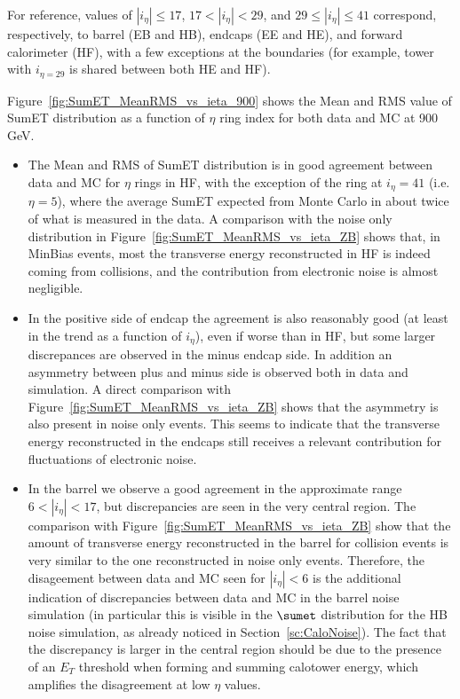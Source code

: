 For reference, values of $|i_{\eta}|\le17$, $17<|i_{\eta}|<29$, and $29\le|i_{\eta}|\le41$ 
correspond, respectively, to barrel (EB and HB), endcaps (EE and HE), and forward 
calorimeter (HF), with a few exceptions at the boundaries 
(for example, tower with $i_{\eta=29}$ is shared between both HE and HF).

Figure~\ref{fig:SumET_MeanRMS_vs_ieta_900} shows the Mean and RMS value of 
SumET distribution as a function of $\eta$ ring index for both data and MC at 900 GeV.
\begin{itemize}
\item The Mean and RMS of SumET distribution is in good agreement between 
data and MC for $\eta$ rings in HF, with the exception 
of the ring at $i_{\eta}=41$ (i.e. $\eta=5$), where the average SumET expected from Monte Carlo 
in about twice of what is measured in the data.
A comparison with the noise only distribution 
in Figure~\ref{fig:SumET_MeanRMS_vs_ieta_ZB} shows that, in MinBias events, 
most the transverse energy reconstructed in HF is indeed coming from collisions, and the contribution
from electronic noise is almost negligible.
\item In the positive side of endcap the agreement is also reasonably good 
(at least in the trend as a function of $i_{\eta}$), even if worse than in HF, 
but some larger discrepances are observed in the minus endcap side.
In addition an asymmetry between plus and minus side is observed both in data and simulation.
A direct comparison with Figure~\ref{fig:SumET_MeanRMS_vs_ieta_ZB} shows that the asymmetry 
is also present in noise only events. This seems to indicate that the transverse energy reconstructed in the 
endcaps still receives a relevant contribution for fluctuations of electronic noise. 
\item In the barrel we observe a good agreement in the approximate range $6<|i_{\eta}|<17$, 
but discrepancies are seen in the very central region. 
The comparison with Figure~\ref{fig:SumET_MeanRMS_vs_ieta_ZB}
show that the amount of transverse energy reconstructed in the barrel for collision 
events is very similar to the one reconstructed in noise only events. 
Therefore, the disageement between data and MC seen for $|i_{\eta}|<6$
is the additional indication of discrepancies between data and MC in 
the barrel noise simulation (in particular this is visible in the $\sumet$ distribution 
for the HB noise simulation, as already noticed in Section~\ref{sc:CaloNoise}).
The fact that the discrepancy is larger in the central region should be due to 
the presence of an $E_{T}$ threshold when forming and summing calotower energy, 
which amplifies the disagreement at low $\eta$ values. 
\end{itemize}

